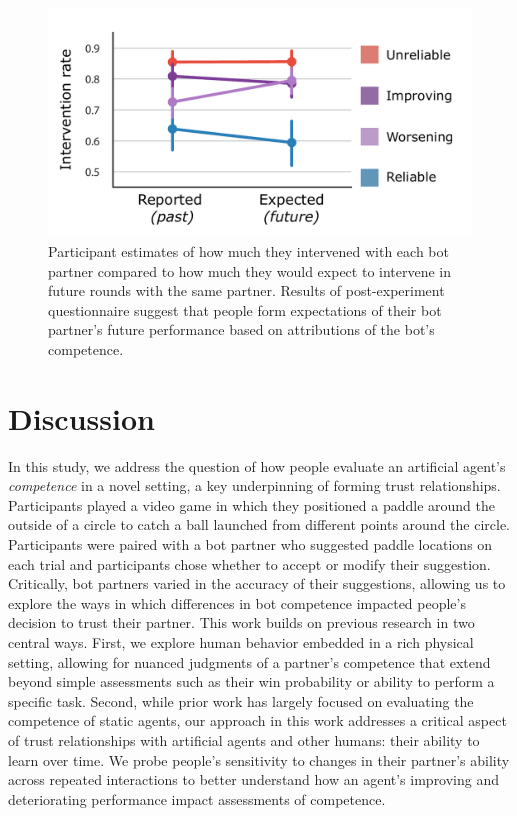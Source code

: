 \documentclass[10pt,letterpaper]{article}
\begin{document}
\begin{figure}[H]
\begin{center}
\includegraphics[width=\linewidth]{img/survey_intervention_expectations_clean.pdf}
\end{center}
\caption{Participant estimates of how much they intervened with each bot partner compared to how much they would expect to intervene in future rounds with the same partner. Results of post-experiment questionnaire suggest that people form expectations of their bot partner's future performance based on attributions of the bot's competence.} 
\label{fig:survey}
\end{figure}


\section{Discussion}
In this study, we address the question of how people evaluate an artificial agent's \textit{competence} in a novel setting, a key underpinning of forming trust relationships. Participants played a video game in which they positioned a paddle around the outside of a circle to catch a ball launched from different points around the circle. Participants were paired with a bot partner who suggested paddle locations on each trial and participants chose whether to accept or modify their suggestion. Critically, bot partners varied in the accuracy of their suggestions, allowing us to explore the ways in which differences in bot competence impacted people's decision to trust their partner. This work builds on previous research in two central ways. First, we explore human behavior embedded in a rich physical setting, allowing for nuanced judgments of a partner's competence that extend beyond simple assessments such as their win probability or ability to perform a specific task. Second, while prior work has largely focused on evaluating the competence of static agents, our approach in this work addresses a critical aspect of trust relationships with artificial agents and other humans: their ability to learn over time. We probe people's sensitivity to changes in their partner's ability across repeated interactions to better understand how an agent's improving and deteriorating performance impact assessments of competence. 
\end{document}
